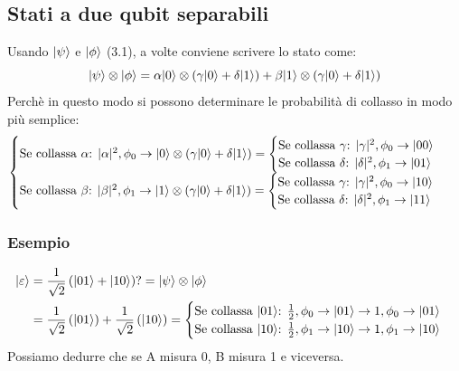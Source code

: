 \documentclass[12pt, a4paper]{report}
\begin{document}
\subsection{Stati a due qubit separabili}
Usando $| \psi \rangle$ e $| \phi \rangle$ (3.1), a volte conviene scrivere lo stato come:
\begin{equation*}
    | \psi \rangle\otimes| \phi \rangle = \alpha| 0 \rangle \otimes \left(\gamma| 0 \rangle+\delta| 1 \rangle\right) + \beta| 1 \rangle \otimes \left(\gamma| 0 \rangle+\delta| 1 \rangle\right)
\end{equation*}
Perchè in questo modo si possono determinare le probabilità di collasso in modo più semplice:
\begin{equation*}
    \begin{cases}
        \text{Se collassa $\alpha$: } |\alpha|^{2},\phi_{0} \rightarrow | 0 \rangle\otimes\left(\gamma| 0 \rangle+\delta| 1 \rangle\right) = \begin{cases}
            \text{Se collassa $\gamma$: } |\gamma|^{2},\phi_{0}\rightarrow | 00 \rangle\\
            \text{Se collassa $\delta$: } |\delta|^{2},\phi_{1}\rightarrow | 01 \rangle
        \end{cases}\\
        \text{Se collassa $\beta$: } |\beta|^{2},\phi_{1} \rightarrow | 1 \rangle\otimes\left(\gamma| 0 \rangle+\delta| 1 \rangle\right) = \begin{cases}
            \text{Se collassa $\gamma$: } |\gamma|^{2},\phi_{0}\rightarrow | 10 \rangle\\
            \text{Se collassa $\delta$: } |\delta|^{2},\phi_{1}\rightarrow | 11 \rangle
        \end{cases}\\
    \end{cases}
\end{equation*}
\subsubsection{Esempio}
\begin{equation*}
    \begin{split}
        | \varepsilon \rangle &= \frac{1}{\sqrt{2}}\left(| 01 \rangle+| 10 \rangle\right) ?= | \psi \rangle \otimes | \phi \rangle \\
        &= \frac{1}{\sqrt{2}}\left(| 01 \rangle\right) + \frac{1}{\sqrt{2}}\left(| 10 \rangle\right) = \begin{cases}
            \text{Se collassa $| 01 \rangle$: } \frac{1}{2}, \phi_{0} \rightarrow | 01 \rangle \rightarrow 1,\phi_{0} \rightarrow | 01 \rangle\\
            \text{Se collassa $| 10 \rangle$: } \frac{1}{2}, \phi_{1} \rightarrow | 10 \rangle \rightarrow 1,\phi_{1} \rightarrow | 10 \rangle
        \end{cases}
    \end{split}
\end{equation*}
Possiamo dedurre che se A misura 0, B misura 1 e viceversa.
\end{document}
